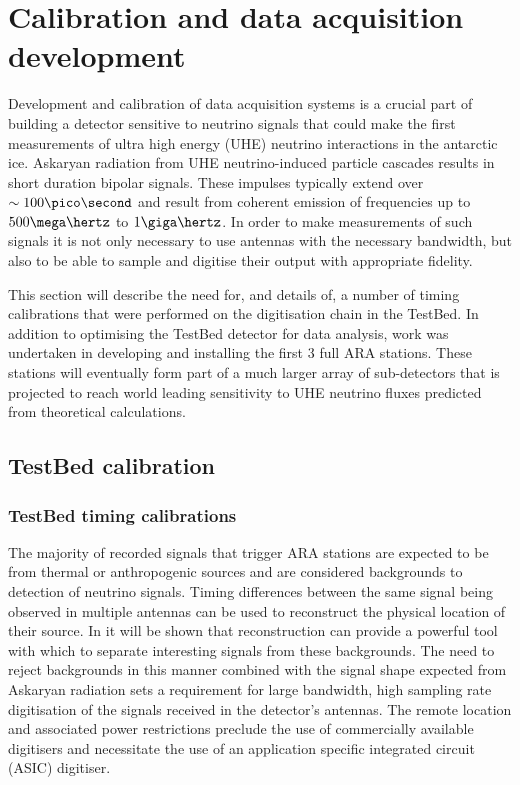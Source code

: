 \chapter{Calibration and data acquisition development}
\label{chap:Calibration}

 Development and calibration of data acquisition systems is a crucial part of building a detector sensitive to neutrino signals that could make the first measurements of ultra high energy (UHE) neutrino interactions in the antarctic ice. Askaryan radiation from UHE neutrino-induced particle cascades results in short duration bipolar signals. These impulses typically extend over $\sim 100 \pico \second$ and result from coherent emission of frequencies up to $500 \mega \hertz$ to $1 \giga \hertz$. In order to make measurements of such signals it is not only necessary to use antennas with the necessary bandwidth, but also to be able to sample and digitise their output with appropriate fidelity.


This section will describe the need for, and details of, a number of timing calibrations that were performed on the digitisation chain in the TestBed. In addition to optimising the TestBed detector for data analysis, work was undertaken in developing and installing the first 3 full ARA stations. These stations will eventually form part of a much larger array of sub-detectors that is projected to reach world leading sensitivity to UHE neutrino fluxes predicted from theoretical calculations.

\section{TestBed calibration}
\label{sec:calibration:TestBed-calibration}



\subsection{TestBed timing calibrations}
\label{sec:calibration:LABRADOR-Digitiser-Chip}

The majority of recorded signals that trigger ARA stations are expected to be from thermal or anthropogenic sources and are considered backgrounds to detection of neutrino signals. Timing differences between the same signal being observed in multiple antennas can be used to reconstruct the physical location of their source. In  it will be shown that reconstruction can provide a powerful tool with which to separate interesting signals from these backgrounds. The need to reject backgrounds in this manner combined with the signal shape expected from Askaryan radiation sets a requirement for large bandwidth, high sampling rate digitisation of the signals received in the detector's antennas. The remote location and associated power restrictions preclude the use of commercially available digitisers and necessitate the use of an application specific integrated circuit (ASIC) digitiser.


